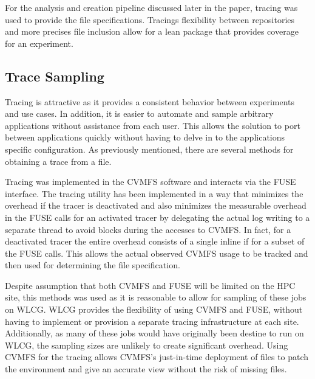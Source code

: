 \documentclass[sigconf]{acmart}
\begin{document}
For the analysis and creation pipeline discussed
later in the paper, tracing was used to provide
the file specifications. 
Tracings flexibility between repositories
and more precises file inclusion allow
for a lean package that provides coverage for
an experiment.

\subsection{Trace Sampling}
Tracing is attractive as it provides a consistent 
behavior between experiments and use cases.
In addition, it is easier to automate and sample arbitrary applications without assistance from each user.
This allows the solution to port between applications
quickly without having to delve in to the applications
specific configuration.
As previously mentioned, there are several methods for
obtaining a trace from a file.

Tracing was implemented in the CVMFS software and
interacts via the FUSE interface.
The tracing utility has been implemented in a way that 
minimizes the overhead if the tracer is deactivated and 
also minimizes the measurable overhead in the FUSE calls for an activated tracer 
by delegating the actual log writing to a separate thread to avoid blocks 
during the accesses to CVMFS. 
In fact, for a deactivated tracer the entire overhead consists of 
a single inline if for a subset of the FUSE calls.
This allows the actual observed CVMFS usage to  be tracked
and then used for determining the file specification.

Despite assumption that both CVMFS and FUSE will be limited
on the HPC site, this methods was used as it is reasonable to
allow for sampling of these jobs on WLCG. 
WLCG provides the flexibility of using CVMFS and FUSE, without
having to implement or provision a separate tracing infrastructure
at each site.
Additionally, as many of these jobs would have originally been 
destine to run on WLCG, the sampling sizes are unlikely to 
create significant overhead.
Using CVMFS for the tracing allows CVMFS's just-in-time deployment
of files to patch the environment and give an accurate view without
the risk of missing files.
\end{document}

